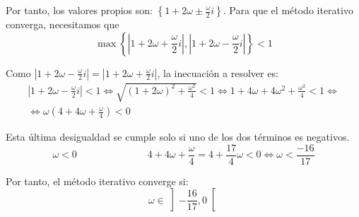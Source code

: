 \begin{ejercicio}
\begin{enumerate}
        Por tanto, los valores propios son: $\left\{1 + 2\omega \pm \frac{\omega}{2}i\right\}$. Para que el método iterativo converga, necesitamos que
        $$\max \left\{\left|1 + 2\omega + \frac{\omega}{2}i\right| ,\left| 1 + 2\omega - \frac{\omega}{2}i\right| \right\} < 1$$

        Como $\left| 1 + 2\omega - \frac{\omega}{2}i\right| = \left| 1 + 2\omega + \frac{\omega}{2}i\right|$, la inecuación a resolver es:
        \begin{multline*}
            \left| 1 + 2\omega - \frac{\omega}{2}i\right| < 1 \Longleftrightarrow \sqrt{(1+2\omega)^2 + \frac{\omega^2}{4}} < 1 \Longleftrightarrow 1 + 4\omega + 4\omega^2 + \frac{\omega^2}{4} < 1 
            \Longleftrightarrow \\ \Longleftrightarrow
            \omega\left(4 + 4\omega + \frac{\omega}{4}\right) < 0
        \end{multline*}

        Esta última desigualdad se cumple solo si uno de los dos términos es negativos.
        \begin{equation*}
            \omega < 0 \hspace{3cm} 4 + 4\omega + \frac{\omega}{4} = 4 + \frac{17}{4}\omega < 0 \Longleftrightarrow \omega < \frac{-16}{17}
        \end{equation*}

        Por tanto, el método iterativo converge si: $$\omega \in \left]-\frac{16}{17},0\right[$$
    \end{enumerate}

\end{ejercicio}